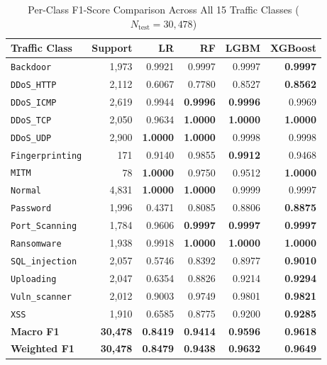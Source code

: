 \documentclass[conference]{IEEEtran}
\begin{document}
\begin{table}[t]
\centering
\caption{Per-Class F1-Score Comparison Across All 15 Traffic Classes ($N_{\text{test}}=30,478$)}
\label{tab:perclass}
\begin{tabular}{lrrrrr}
\toprule
\textbf{Traffic Class} & \textbf{Support} & \textbf{LR} & \textbf{RF} & \textbf{LGBM} & \textbf{XGBoost} \\
\midrule
\texttt{Backdoor} & 1,973 & 0.9921 & 0.9997 & 0.9997 & \textbf{0.9997} \\
\texttt{DDoS\_HTTP} & 2,112 & 0.6067 & 0.7780 & 0.8527 & \textbf{0.8562} \\
\texttt{DDoS\_ICMP} & 2,619 & 0.9944 & \textbf{0.9996} & \textbf{0.9996} & 0.9969 \\
\texttt{DDoS\_TCP} & 2,050 & 0.9634 & \textbf{1.0000} & \textbf{1.0000} & \textbf{1.0000} \\
\texttt{DDoS\_UDP} & 2,900 & \textbf{1.0000} & \textbf{1.0000} & 0.9998 & 0.9998 \\
\texttt{Fingerprinting} & 171 & 0.9140 & 0.9855 & \textbf{0.9912} & 0.9468 \\
\texttt{MITM} & 78 & \textbf{1.0000} & 0.9750 & 0.9512 & \textbf{1.0000} \\
\texttt{Normal} & 4,831 & \textbf{1.0000} & \textbf{1.0000} & 0.9999 & 0.9997 \\
\texttt{Password} & 1,996 & 0.4371 & 0.8085 & 0.8806 & \textbf{0.8875} \\
\texttt{Port\_Scanning} & 1,784 & 0.9606 & \textbf{0.9997} & \textbf{0.9997} & \textbf{0.9997} \\
\texttt{Ransomware} & 1,938 & 0.9918 & \textbf{1.0000} & \textbf{1.0000} & \textbf{1.0000} \\
\texttt{SQL\_injection} & 2,057 & 0.5746 & 0.8392 & 0.8977 & \textbf{0.9010} \\
\texttt{Uploading} & 2,047 & 0.6354 & 0.8826 & 0.9214 & \textbf{0.9294} \\
\texttt{Vuln\_scanner} & 2,012 & 0.9003 & 0.9749 & 0.9801 & \textbf{0.9821} \\
\texttt{XSS} & 1,910 & 0.6585 & 0.8775 & 0.9200 & \textbf{0.9285} \\
\midrule
\textbf{Macro F1} & \textbf{30,478} & \textbf{0.8419} & \textbf{0.9414} & \textbf{0.9596} & \textbf{0.9618} \\
\textbf{Weighted F1} & \textbf{30,478} & \textbf{0.8479} & \textbf{0.9438} & \textbf{0.9632} & \textbf{0.9649} \\
\bottomrule
\end{tabular}
\end{table}
\end{document}
